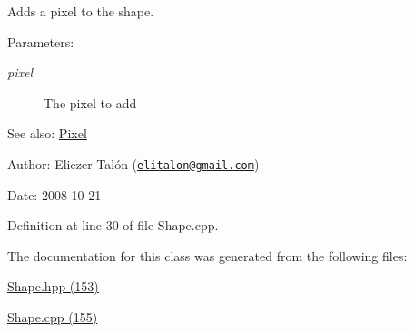 Adds a pixel to the shape. 

\begin{Desc}
\item[Parameters:]
\begin{description}
\item[{\em pixel}]The pixel to add\end{description}
\end{Desc}
\begin{Desc}
\item[See also:]\hyperlink{_pixel_8hpp_535e59456e3e633842529cfa8ea103c4}{Pixel}\end{Desc}
\begin{Desc}
\item[Author:]Eliezer Talón (\href{mailto:elitalon@gmail.com}{\tt elitalon@gmail.com}) \end{Desc}
\begin{Desc}
\item[Date:]2008-10-21 \end{Desc}


Definition at line 30 of file Shape.cpp.

The documentation for this class was generated from the following files:\begin{CompactItemize}
\item 
\hyperlink{_shape_8hpp}{Shape.hpp (153)}\item 
\hyperlink{_shape_8cpp}{Shape.cpp (155)}\end{CompactItemize}
